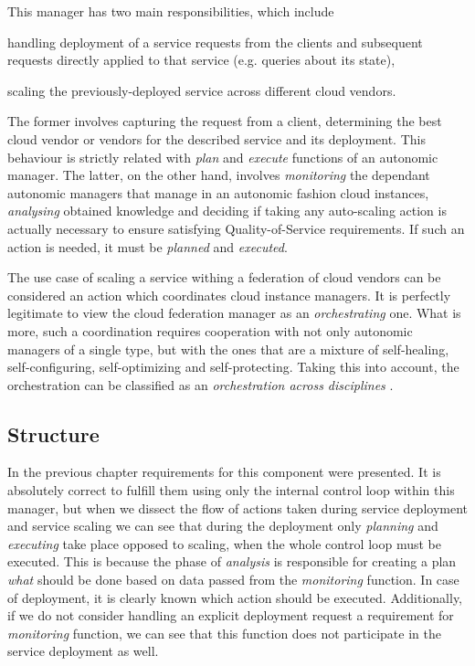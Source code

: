 This manager has two main responsibilities, which include
\begin{inparaenum}[1)]
\item handling deployment of a service requests from the clients and subsequent requests directly applied to that service (e.g. queries about its state), 
\item scaling the previously-deployed service across different cloud vendors.
\end{inparaenum}
The former involves capturing the request from a client, determining the best cloud vendor or vendors for the described service and its deployment. This behaviour is strictly related with \emph{plan} and \emph{execute} functions of an autonomic manager. The latter, on the other hand, involves \emph{monitoring} the dependant autonomic managers that manage in an autonomic fashion cloud instances, \emph{analysing} obtained knowledge and deciding if taking any auto-scaling action is actually necessary to ensure satisfying Quality-of-Service requirements. If such an action is needed, it must be \emph{planned} and \emph{executed}.

The use case of scaling a service withing a federation of cloud vendors can be considered an action which coordinates cloud instance managers. It is perfectly legitimate to view the cloud federation manager as an \emph{orchestrating} one. What is more, such a coordination requires cooperation with not only autonomic managers of a single type, but with the ones that are a mixture of self-healing, self-configuring, self-optimizing and self-protecting. Taking this into account, the orchestration can be classified as an \emph{orchestration across disciplines} \cite{IBM06}.

\subsection{Structure}

In the previous chapter requirements for this component were presented. It is absolutely correct to fulfill them using only the internal control loop within this manager, but when we dissect the flow of actions taken during service deployment and service scaling we can see that during the deployment only \emph{planning} and \emph{executing} take place opposed to scaling, when the whole control loop must be executed. This is because the phase of \emph{analysis} is responsible for creating a plan \emph{what} should be done based on data passed from the \emph{monitoring} function. In case of deployment, it is clearly known which action should be executed. Additionally, if we do not consider handling an explicit deployment request a requirement for \emph{monitoring} function, we can see that this function does not participate in the service deployment as well.

